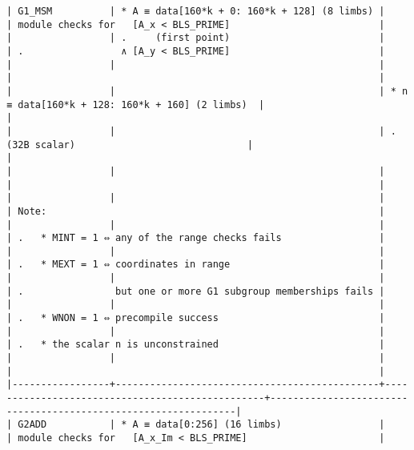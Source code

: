 \documentclass[varwidth=\maxdimen,margin=0.5cm,multi={verbatim}]{standalone}
\begin{document}
\begin{verbatim}
| G1_MSM          | * A ≡ data[160*k + 0: 160*k + 128] (8 limbs) |                                                 | module checks for   [A_x < BLS_PRIME]                          |
|                 | .     (first point)                          |                                                 | .                 ∧ [A_y < BLS_PRIME]                          |
|                 |                                              |                                                 |                                                                |
|                 |                                              | * n ≡ data[160*k + 128: 160*k + 160] (2 limbs)  |                                                                |
|                 |                                              | .     (32B scalar)                              |                                                                |
|                 |                                              |                                                 |                                                                |
|                 |                                              |                                                 | Note:                                                          |
|                 |                                              |                                                 | .   * MINT = 1 ⇔ any of the range checks fails                 |
|                 |                                              |                                                 | .   * MEXT = 1 ⇔ coordinates in range                          |
|                 |                                              |                                                 | .                but one or more G1 subgroup memberships fails |
|                 |                                              |                                                 | .   * WNON = 1 ⇔ precompile success                            |
|                 |                                              |                                                 | .   * the scalar n is unconstrained                            |
|                 |                                              |                                                 |                                                                |
|-----------------+----------------------------------------------+-------------------------------------------------+----------------------------------------------------------------|
| G2ADD           | * A ≡ data[0:256] (16 limbs)                 |                                                 | module checks for   [A_x_Im < BLS_PRIME]                       |

\end{verbatim}
\end{document}
